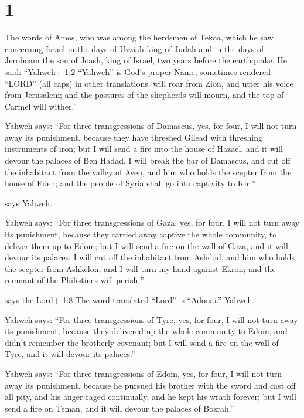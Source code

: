 \hypertarget{section}{%
\section{1}\label{section}}

 The words of Amos, who was among the herdsmen of Tekoa,
which he saw concerning Israel in the days of Uzziah king of Judah and
in the days of Jeroboam the son of Joash, king of Israel, two years
before the earthquake.  He said: ``Yahweh+ 1:2 ``Yahweh'' is
God's proper Name, sometimes rendered ``LORD'' (all caps) in other
translations. will roar from Zion, and utter his voice from Jerusalem;
and the pastures of the shepherds will mourn, and the top of Carmel will
wither.''

 Yahweh says: ``For three transgressions of Damascus, yes,
for four, I will not turn away its punishment, because they have
threshed Gilead with threshing instruments of iron;  but I
will send a fire into the house of Hazael, and it will devour the
palaces of Ben Hadad.  I will break the bar of Damascus, and
cut off the inhabitant from the valley of Aven, and him who holds the
scepter from the house of Eden; and the people of Syria shall go into
captivity to Kir,''

says Yahweh.

 Yahweh says: ``For three transgressions of Gaza, yes, for
four, I will not turn away its punishment, because they carried away
captive the whole community, to deliver them up to Edom; 
but I will send a fire on the wall of Gaza, and it will devour its
palaces.  I will cut off the inhabitant from Ashdod, and him
who holds the scepter from Ashkelon; and I will turn my hand against
Ekron; and the remnant of the Philistines will perish,''

says the Lord+ 1:8 The word translated ``Lord'' is ``Adonai.'' Yahweh.

 Yahweh says: ``For three transgressions of Tyre, yes, for
four, I will not turn away its punishment; because they delivered up the
whole community to Edom, and didn't remember the brotherly covenant;
 but I will send a fire on the wall of Tyre, and it will
devour its palaces.''

 Yahweh says: ``For three transgressions of Edom, yes, for
four, I will not turn away its punishment, because he pursued his
brother with the sword and cast off all pity, and his anger raged
continually, and he kept his wrath forever;  but I will
send a fire on Teman, and it will devour the palaces of Bozrah.''

